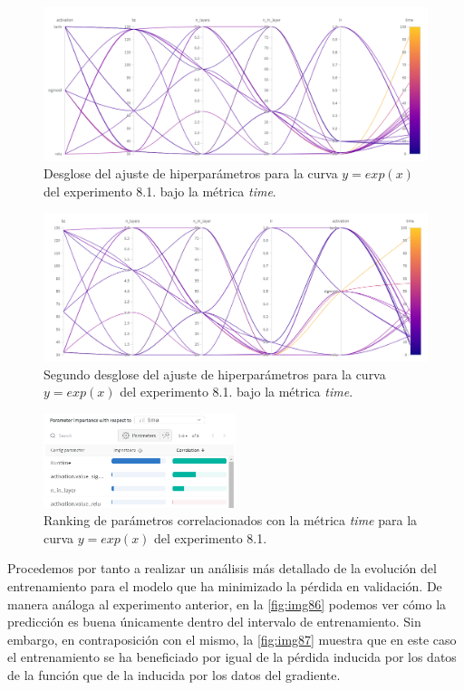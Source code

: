 \begin{figure}[htbp]
    \centering
    \includegraphics[width=1\textwidth]{img/img81.png}
    \caption{Desglose del ajuste de hiperparámetros para la curva $y=exp(x)$ del experimento 8.1.  bajo la métrica \textit{time}.}
    \label{fig:img81}
\end{figure}


\begin{figure}[htbp]
    \centering
    \includegraphics[width=1\textwidth]{img/img85.png}
    \caption{Segundo desglose del ajuste de hiperparámetros para la curva $y=exp(x)$ del experimento 8.1.  bajo la métrica \textit{time}.}
    \label{fig:img85}
\end{figure}

\begin{figure}[htbp]
    \centering
    \includegraphics[width=0.5\textwidth]{img/img83.png}
    \caption{Ranking de parámetros correlacionados con la métrica \textit{time} para la curva $y=exp(x)$ del experimento 8.1.}
    \label{fig:img83}
\end{figure}


Procedemos por tanto a realizar un análisis más detallado de la evolución del entrenamiento para el modelo que ha minimizado la pérdida en validación. De manera análoga al experimento anterior, en la \autoref{fig:img86} podemos ver cómo la predicción es buena únicamente dentro del intervalo de entrenamiento. Sin embargo, en contraposición con el mismo, la \autoref{fig:img87} muestra que en este caso el entrenamiento se ha beneficiado por igual de la pérdida inducida por los datos de la función que de la inducida por los datos del gradiente. 

